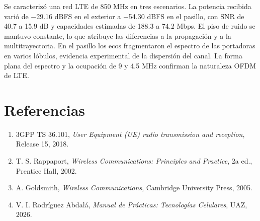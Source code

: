 \documentclass[11pt,a4paper]{article}
\begin{document}
Se caracterizó una red LTE de 850 MHz en tres escenarios. La potencia recibida varió de
$-$29.16 dBFS en el exterior a $-$54.30 dBFS en el pasillo, con SNR de 40.7 a 15.9 dB y
capacidades estimadas de 188.3 a 74.2 Mbps. El piso de ruido se mantuvo constante, lo que
atribuye las diferencias a la propagación y a la multitrayectoria. En el pasillo los ecos
fragmentaron el espectro de las portadoras en varios lóbulos, evidencia experimental de la
dispersión del canal. La forma plana del espectro y la ocupación de 9 y 4.5 MHz confirman
la naturaleza OFDM de LTE.

\section{Referencias}

\begin{enumerate}
  \item 3GPP TS 36.101, \emph{User Equipment (UE) radio transmission and reception},
        Release 15, 2018.
  \item T. S. Rappaport, \emph{Wireless Communications: Principles and Practice},
        2a ed., Prentice Hall, 2002.
  \item A. Goldsmith, \emph{Wireless Communications}, Cambridge University Press, 2005.
  \item V. I. Rodríguez Abdalá, \emph{Manual de Prácticas: Tecnologías Celulares},
        UAZ, 2026.
\end{enumerate}
\end{document}
